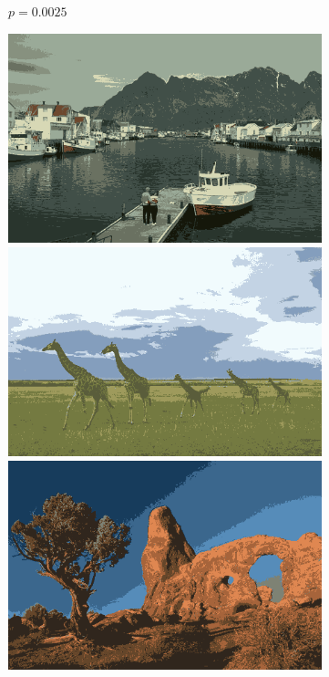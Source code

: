 \documentclass[11pt,a4paper]{article}
\begin{document}
\begin{figure}
\begin{subfigure}[b]{0.24\textwidth}
        \caption{$p=0.0025$}
    \end{subfigure}
    \hfill
    \begin{subfigure}[b]{0.24\textwidth}
        \centering
        \includegraphics[width=\textwidth]{figures/sampling_rate/0.005/219090_avg.png}
        \includegraphics[width=\textwidth]{figures/sampling_rate/0.005/253055_avg.png}
        \includegraphics[width=\textwidth]{figures/sampling_rate/0.005/295087_avg.png}

\end{subfigure}
\end{figure}
\end{document}
